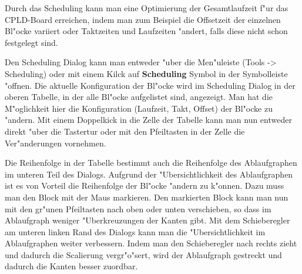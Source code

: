 \documentclass[a4paper,titlepage,12pt,ngerman]{scrbook}
\begin{document}
Durch das Scheduling kann man eine Optimierung der Gesamtlaufzeit f"ur das CPLD-Board erreichen, indem man zum Beispiel die Offsetzeit der einzelnen Bl"ocke variiert oder Taktzeiten und Laufzeiten "andert, falls diese nicht schon festgelegt sind.\par
Den Scheduling Dialog kann man entweder "uber die Men"uleiste (Tools -> Scheduling) oder mit einem Kilck auf {\bf Scheduling} Symbol in der Symbolleiste "offnen.
Die aktuelle Konfiguration der Bl"ocke wird im Scheduling Dialog in der oberen Tabelle, in der alle Bl"ocke aufgelistet sind, angezeigt. Man hat die M"oglichkeit hier die Konfiguration (Laufzeit, Takt, Offset) der Bl"ocke zu "andern. Mit einem Doppelkick in die Zelle der Tabelle kann man nun entweder direkt "uber die Tastertur oder mit den Pfeiltasten in der Zelle die Ver"anderungen vornehmen.\par
Die Reihenfolge in der Tabelle bestimmt auch die Reihenfolge des Ablaufgraphen im unteren Teil des Dialogs. Aufgrund der "Ubersichtlichkeit des Ablaufgraphen ist es von Vorteil die Reihenfolge der Bl"ocke "andern zu k"onnen. Dazu muss man den Block mit der Maus markieren. Den markierten Block kann man nun mit den gr"unen Pfeiltasten nach oben oder unten verschieben, so dass im Ablaufgraph weniger "Uberkreuzungen der Kanten gibt. Mit dem Schieberegler am unteren linken Rand des Dialogs kann man die "Ubersichtlichkeit im Ablaufgraphen weiter verbessern. Indem man den Schieberegler nach rechts zieht und dadurch die Scalierung vergr"o"sert, wird der Ablaufgraph gestreckt und dadurch die Kanten besser zuordbar.\par
\end{document}
